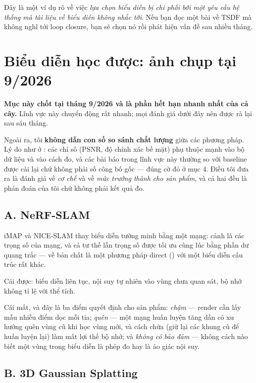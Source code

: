 \documentclass[../../vslam.tex]{subfiles}
\begin{document}
Đây là một ví dụ rõ về việc \emph{lựa chọn biểu diễn bị chi phối bởi một yêu cầu hệ thống mà tài liệu về biểu diễn không nhắc tới}. Nếu bạn đọc một bài về TSDF mà không nghĩ tới loop closure, bạn sẽ chọn nó rồi phát hiện vấn đề sau nhiều tháng.

\section{Biểu diễn học được: ảnh chụp tại 9/2026}

\begin{cambay}
\textbf{Mục này chốt tại tháng 9/2026 và là phần hết hạn nhanh nhất của cả cây.} Lĩnh vực này chuyển động rất nhanh; mọi đánh giá dưới đây nên được rà lại sau sáu tháng.

Ngoài ra, tôi \textbf{không dẫn con số so sánh chất lượng} giữa các phương pháp. Lý do như ở : các chỉ số (PSNR, độ chính xác bề mặt) phụ thuộc mạnh vào bộ dữ liệu và vào cách đo, và các bài báo trong lĩnh vực này thường so với baseline được cài lại chứ không phải số công bố gốc --- đúng cờ đỏ ở  mục 4. Điều tôi đưa ra là đánh giá về \emph{cơ chế} và về \emph{mức trưởng thành cho sản phẩm}, và cả hai đều là phán đoán của tôi chứ không phải kết quả đo.
\end{cambay}

\subsection{A. NeRF-SLAM}

iMAP \cite{sucar2021imap} và NICE-SLAM \cite{zhu2022niceslam} thay biểu diễn tường minh bằng một mạng: cảnh là các trọng số của mạng, và cả tư thế lẫn trọng số được tối ưu cùng lúc bằng phần dư quang trắc --- về bản chất là một phương pháp direct () với một biểu diễn cấu trúc rất khác.

Cái được: biểu diễn liên tục, nội suy tự nhiên vào vùng chưa quan sát, bộ nhớ không tỉ lệ với thể tích.

Cái mất, và đây là ba điểm quyết định cho sản phẩm: \emph{chậm} --- render cần lấy mẫu nhiều điểm dọc mỗi tia; \emph{quên} --- một mạng huấn luyện tăng dần có xu hướng quên vùng cũ khi học vùng mới, và cách chữa (giữ lại các khung cũ để huấn luyện lại) làm mất lợi thế bộ nhớ; và \emph{không có bảo đảm} --- không cách nào biết một vùng trong biểu diễn là phép đo hay là ảo giác nội suy.

\subsection{B. 3D Gaussian Splatting}
\end{document}
